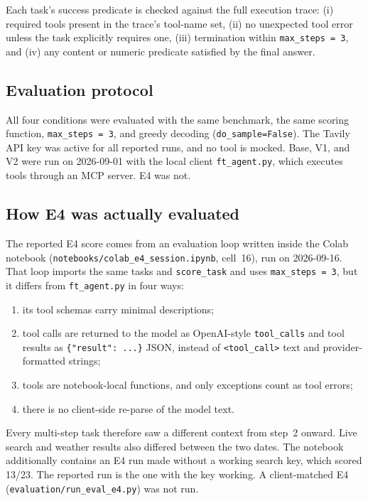 \documentclass[10pt,twocolumn]{article}
\newcommand{\code}[1]{\texttt{#1}}
\begin{document}
Each task's success predicate is checked against the full execution trace: (i) required tools present in the trace's tool-name set, (ii) no unexpected tool error unless the task explicitly requires one, (iii) termination within \code{max\_steps = 3}, and (iv) any content or numeric predicate satisfied by the final answer.

\subsection{Evaluation protocol}

All four conditions were evaluated with the same benchmark, the same scoring function, \code{max\_steps = 3}, and greedy decoding (\code{do\_sample=False}). The Tavily API key was active for all reported runs, and no tool is mocked. Base, V1, and V2 were run on 2026-09-01 with the local client \code{ft\_agent.py}, which executes tools through an MCP server. E4 was not.

\subsection{How E4 was actually evaluated}
\label{sec:e4client}

The reported E4 score comes from an evaluation loop written inside the Colab notebook (\code{notebooks/colab\_e4\_session.ipynb}, cell~16), run on 2026-09-16. That loop imports the same tasks and \code{score\_task} and uses \code{max\_steps = 3}, but it differs from \code{ft\_agent.py} in four ways:
\begin{enumerate}\itemsep1pt
\item its tool schemas carry minimal descriptions;
\item tool calls are returned to the model as OpenAI-style \code{tool\_calls} and tool results as \code{\{"result": ...\}} JSON, instead of \code{<tool\_call>} text and provider-formatted strings;
\item tools are notebook-local functions, and only exceptions count as tool errors;
\item there is no client-side re-parse of the model text.
\end{enumerate}
Every multi-step task therefore saw a different context from step~2 onward. Live search and weather results also differed between the two dates. The notebook additionally contains an E4 run made without a working search key, which scored 13/23. The reported run is the one with the key working. A client-matched E4 (\code{evaluation/run\_eval\_e4.py}) was not run.
\end{document}
